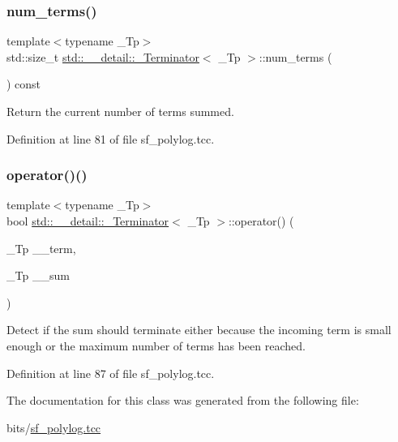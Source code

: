 \subsubsection{\texorpdfstring{num\+\_\+terms()}{num\_terms()}}
{\footnotesize\ttfamily template$<$typename \+\_\+\+Tp$>$ \\
std\+::size\+\_\+t \hyperlink{classstd_1_1____detail_1_1__Terminator}{std\+::\+\_\+\+\_\+detail\+::\+\_\+\+Terminator}$<$ \+\_\+\+Tp $>$\+::num\+\_\+terms (\begin{DoxyParamCaption}{ }\end{DoxyParamCaption}) const\hspace{0.3cm}{\ttfamily [inline]}}



Return the current number of terms summed. 



Definition at line 81 of file sf\+\_\+polylog.\+tcc.

\mbox{\label{classstd_1_1____detail_1_1__Terminator_a6c69c623075f36692ae86dd65b9c4a5c}} 
\subsubsection{\texorpdfstring{operator()()}{operator()()}}
{\footnotesize\ttfamily template$<$typename \+\_\+\+Tp$>$ \\
bool \hyperlink{classstd_1_1____detail_1_1__Terminator}{std\+::\+\_\+\+\_\+detail\+::\+\_\+\+Terminator}$<$ \+\_\+\+Tp $>$\+::operator() (\begin{DoxyParamCaption}\item[{\+\_\+\+Tp}]{\+\_\+\+\_\+term,  }\item[{\+\_\+\+Tp}]{\+\_\+\+\_\+sum }\end{DoxyParamCaption})\hspace{0.3cm}{\ttfamily [inline]}}



Detect if the sum should terminate either because the incoming term is small enough or the maximum number of terms has been reached. 



Definition at line 87 of file sf\+\_\+polylog.\+tcc.



The documentation for this class was generated from the following file\+:\begin{DoxyCompactItemize}
\item 
bits/\hyperlink{sf__polylog_8tcc}{sf\+\_\+polylog.\+tcc}\end{DoxyCompactItemize}
